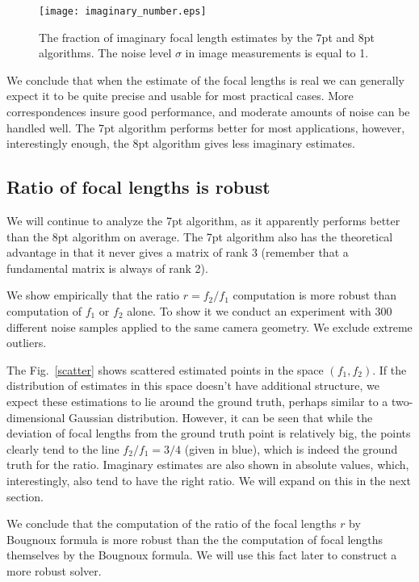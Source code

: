 \begin{figure}[h!]
  \begin{center}
    \texttt{[image: imaginary\_number.eps]}
    \caption[Fraction of imaginary focal length estimates versus number of correspondences]{The fraction of imaginary focal length estimates by the 7pt and 8pt algorithms. The noise level $\sigma$ in image measurements is equal to 1. }
    \label{imaginary_number}
  \end{center}
\end{figure}

We conclude that when the estimate of the focal lengths is real we can generally expect it to be quite precise and usable for most practical cases. More correspondences insure good performance, and moderate amounts of noise can be handled well. The 7pt algorithm performs better for most applications, however, interestingly enough, the 8pt algorithm gives less imaginary estimates.

\subsection{Ratio of focal lengths is robust}

We will continue to analyze the 7pt algorithm, as it apparently performs better than the 8pt algorithm on average. The 7pt algorithm also has the theoretical advantage in that it never gives a matrix of rank 3 (remember that a fundamental matrix is always of rank 2).


We  show empirically that the ratio $r={f_2}\slash{f_1}$  computation is more robust than computation of $f_1$ or $f_2$ alone.
To show it we conduct an experiment with  300 different noise samples applied to the same camera geometry. We exclude extreme outliers.

The Fig.~\ref{scatter} shows scattered estimated points in the space $(f_1,f_2)$. If the distribution of estimates in this space doesn't have additional structure, we expect these estimations to lie around the ground truth, perhaps similar to a two-dimensional Gaussian distribution. However,  it can be seen that while the deviation of focal lengths from the ground truth point is relatively big, the points clearly tend to the line $f_2 \slash f_1= 3\slash4$ (given in blue), which is indeed the ground truth for the ratio. Imaginary estimates are also shown in absolute values, which, interestingly, also tend to have the right ratio. We will expand on this in the next section.

We conclude that the computation of the ratio of the focal lengths $r$ by Bougnoux formula is more robust than the the computation of focal lengths themselves by the Bougnoux formula.
We will use this fact later to construct a more robust solver.

